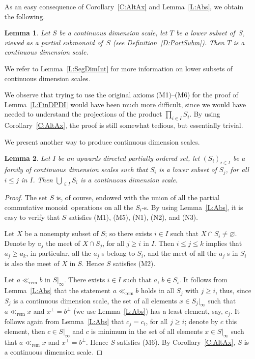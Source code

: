 \documentclass[psamsfonts,reqno]{memo-l}
\theoremstyle{plain}
\newtheorem{lemma}{Lemma}[section]
\theoremstyle{definition}
\theoremstyle{remark}
\numberwithin{equation}{section}
\newcommand{\es}{\varnothing}
\newcommand{\rem}{\ll_{\mathrm{rem}}}
\newcommand{\DI}[1]{#1|_{\infty}}
\newcommand{\pup}[1]{\textup{(}{#1}\textup{)}}
\newcommand{\pcm}{partial commutative mon\-oid}
\begin{document}
As an easy consequence of Corollary~\ref{C:AltAx} and Lemma~\ref{L:Abs}, we
obtain the following.

\begin{lemma}\label{L:SegDI}
Let $S$ be a continuous dimension scale, let $T$ be a
lower subset of~$S$, viewed as a partial submonoid of~$S$ \pup{see
Definition~\textup{\ref{D:PartSubm}}}. Then $T$ is a continuous dimension scale.
\end{lemma}

We refer to Lemma~\ref{L:SegDimInt} for more information on lower subsets
of continuous dimension scales.

We observe that trying to use the original axioms (M1)--(M6) for the proof
of Lemma~\ref{L:FinDPDI} would have been much more difficult, since we
would have needed to understand the projections of the product
$\prod_{i\in I}S_i$. By using Corollary~\ref{C:AltAx}, the proof is
still somewhat tedious, but essentially trivial.

We present another way to produce continuous dimension scales.

\begin{lemma}\label{L:DirUn}
Let $I$ be an upwards directed partially ordered set, let $(S_i)_{i\in I}$
be a family of continuous dimension scales such that $S_i$
is a lower subset of
$S_j$, for all $i\leq j$ in $I$. Then $\bigcup_{\in I}S_i$ is a continuous dimension scale.
\end{lemma}

\begin{proof}
The set $S$ is, of course, endowed with the union of all the
\pcm\ operations on all the $S_i$-s. By using Lemma~\ref{L:Abs}, it is easy
to verify that $S$ satisfies (M1), (M5), (N1), (N2), and (N3).

Let $X$ be a nonempty subset of $S$; so
there exists $i\in I$ such that $X\cap S_i\neq\es$. Denote by $a_j$ the
meet of $X\cap S_j$, for all $j\geq i$ in $I$. Then $i\leq j\leq k$ implies
that $a_j\geq a_k$, in particular, all the $a_j$-s belong to $S_i$, and the
meet of all the $a_j$-s in $S_i$ is also the meet of $X$ in $S$. Hence $S$
satisfies (M2).

Let $a\rem b$ in $\DI{S}$. There exists $i\in I$ such that $a$, $b\in S_i$.
It follows from Lemma~\ref{L:Abs} that the statement $a\rem b$ holds in all
$S_j$ with $j\geq i$, thus, since $S_j$ is a continuous dimension scale, the set of all elements $x\in\DI{S_j}$
such that $a\rem x$ and $x^\bot=b^\bot$ (we use Lemma~\ref{L:Abs}) has a
least element, say, $c_j$. It follows again from Lemma~\ref{L:Abs} that
$c_j=c_i$, for all $j\geq i$; denote by $c$ this element, then $c\in\DI{S}$
and $c$ is minimum in the set of all elements $x\in\DI{S}$ such that $a\rem
x$ and $x^\bot=b^\bot$. Hence $S$ satisfies (M6). By
Corollary~\ref{C:AltAx}, $S$ is a continuous dimension scale.
\end{proof}
\end{document}
